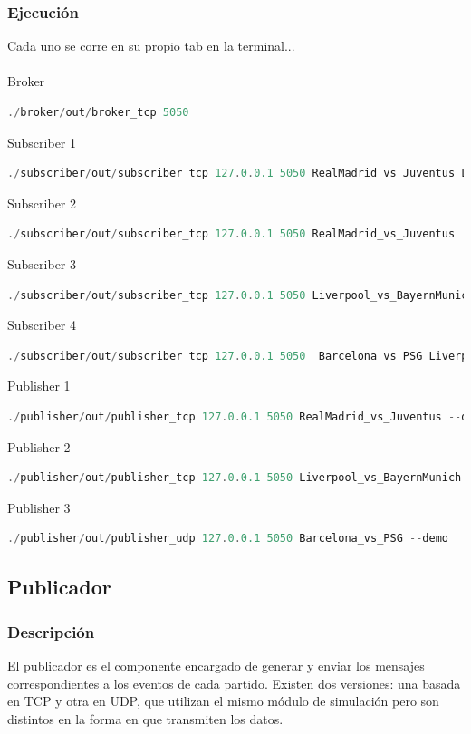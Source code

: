 \documentclass[10pt]{article}
\begin{document}
\subsubsection{Ejecución}
Cada uno se corre en su propio tab en la terminal...
\\
\\
Broker
\begin{lstlisting}[language=C, caption={}]
./broker/out/broker_tcp 5050
\end{lstlisting}
Subscriber 1
\begin{lstlisting}[language=C, caption={}]
./subscriber/out/subscriber_tcp 127.0.0.1 5050 RealMadrid_vs_Juventus Liverpool_vs_BayernMunich Barcelona_vs_PSG
\end{lstlisting}
Subscriber 2
\begin{lstlisting}[language=C, caption={}]
./subscriber/out/subscriber_tcp 127.0.0.1 5050 RealMadrid_vs_Juventus
\end{lstlisting}
Subscriber 3
\begin{lstlisting}[language=C, caption={}]
./subscriber/out/subscriber_tcp 127.0.0.1 5050 Liverpool_vs_BayernMunich
\end{lstlisting}
Subscriber 4
\begin{lstlisting}[language=C, caption={}]
./subscriber/out/subscriber_tcp 127.0.0.1 5050  Barcelona_vs_PSG Liverpool_vs_BayernMunich 
\end{lstlisting}
Publisher 1
\begin{lstlisting}[language=C, caption={}]
./publisher/out/publisher_tcp 127.0.0.1 5050 RealMadrid_vs_Juventus --demo
\end{lstlisting}
Publisher 2
\begin{lstlisting}[language=C, caption={}]
./publisher/out/publisher_tcp 127.0.0.1 5050 Liverpool_vs_BayernMunich --demo
\end{lstlisting}
Publisher 3
\begin{lstlisting}[language=C, caption={}]
./publisher/out/publisher_udp 127.0.0.1 5050 Barcelona_vs_PSG --demo
\end{lstlisting}


\subsection{Publicador}
\subsubsection{Descripción}
El publicador es el componente encargado de generar y enviar los mensajes correspondientes a los eventos de cada partido. Existen dos versiones: una basada en TCP y otra en UDP, que utilizan el mismo módulo de simulación pero son distintos en la forma en que transmiten los datos.
\end{document}
